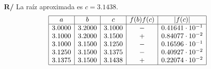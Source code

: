 \documentclass[12pt]{article}
\begin{document}
\begin{enumerate}[leftmargin=*,widest=9]
\begin{enumerate}[label=\alph*]
\textbf{R/} La raíz aproximada es \(c = 3.1438 \).
\begin{equation*}
     \begin{array}{|c|c|c|c|c|}
   \hline
   a & b & c & f(b)f(c) & |f(c)| \\
   \hline
   3.0000 & 3.2000 & 3.1000 & - & 0.41641 \cdot 10^{-1} \\
   3.1000 & 3.2000 & 3.1500 & + & 0.84077 \cdot 10^{-2} \\
   3.1000 & 3.1500 & 3.1250 & - & 0.16596 \cdot 10^{-1} \\
   3.1250 & 3.1500 & 3.1375 & - & 0.40927 \cdot 10^{-2} \\
   3.1375 & 3.1500 & 3.1438 & + & 0.22074 \cdot 10^{-2} \\
   \hline
   \end{array}
\end{equation*}   
    \end{enumerate}
  \end{enumerate}
\end{document}
